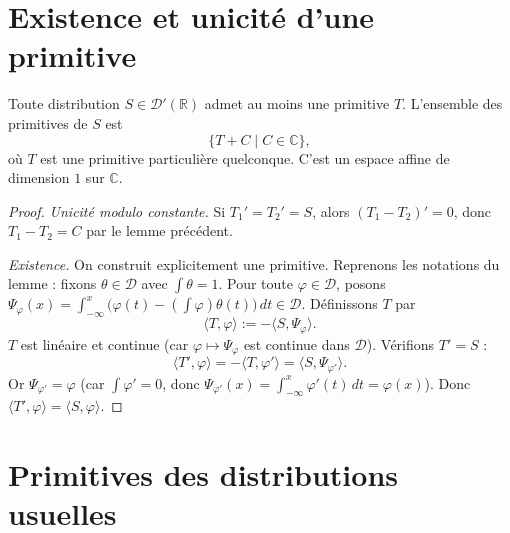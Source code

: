 \documentclass[12pt,a4paper,openany]{book}
\theoremstyle{definition}
\theoremstyle{plain}
\theoremstyle{remark}
\begin{document}
	\section{Existence et unicité d'une primitive}
	
	\begin{theorem}
		Toute distribution $S \in \mathcal{D}'(\mathbb{R})$ admet au moins une primitive $T$. L'ensemble des primitives de $S$ est
		\[
		\{T + C \mid C \in \mathbb{C}\},
		\]
		où $T$ est une primitive particulière quelconque. C'est un espace affine de dimension $1$ sur $\mathbb{C}$.
	\end{theorem}
	
	\begin{proof}
		\emph{Unicité modulo constante.} Si $T_1' = T_2' = S$, alors $(T_1 - T_2)' = 0$, donc $T_1 - T_2 = C$ par le lemme précédent.
		
		\emph{Existence.} On construit explicitement une primitive. Reprenons les notations du lemme : fixons $\theta \in \mathcal{D}$ avec $\int\theta = 1$.
		Pour toute $\varphi \in \mathcal{D}$, posons $\Psi_\varphi(x) = \int_{-\infty}^x\bigl(\varphi(t) - (\int\varphi)\theta(t)\bigr)\,dt \in \mathcal{D}$.
		Définissons $T$ par
		\[
		\langle T, \varphi\rangle := -\langle S, \Psi_\varphi\rangle.
		\]
		$T$ est linéaire et continue (car $\varphi \mapsto \Psi_\varphi$ est continue dans $\mathcal{D}$). Vérifions $T' = S$ :
		\[
		\langle T', \varphi\rangle = -\langle T, \varphi'\rangle = \langle S, \Psi_{\varphi'}\rangle.
		\]
		Or $\Psi_{\varphi'} = \varphi$ (car $\int\varphi' = 0$, donc $\Psi_{\varphi'}(x) = \int_{-\infty}^x\varphi'(t)\,dt = \varphi(x)$). Donc $\langle T', \varphi\rangle = \langle S, \varphi\rangle$.
	\end{proof}
	
	\section{Primitives des distributions usuelles}
	
\end{document}
